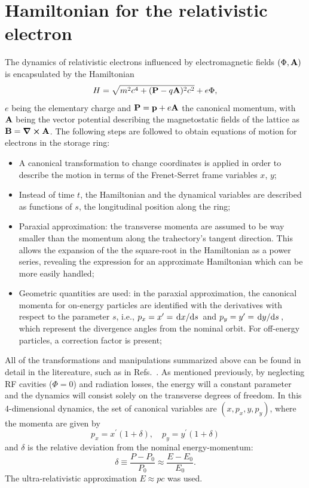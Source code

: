 \section{Hamiltonian for the relativistic electron}
The dynamics of relativistic electrons influenced by electromagnetic fields $(\Phi, \vb{A})$ is encapsulated by the Hamiltonian \cite{landau_classical_1975}
    \begin{equation*}
        H=\sqrt{m^2c^4+(\vb{P}-q\vb{A})^2c^2}+e\Phi,
    \end{equation*}
 $e$ being the elementary charge and $\vb{P}=\vb{p}+e\vb{A}$ the canonical momentum, with $\vb{A}$ being the vector potential describing the magnetostatic fields of the lattice as $\vb{B}=\curl \vb{A}$. The following steps are followed to obtain equations of motion for electrons in the storage ring:
 \begin{itemize}
    \item A canonical transformation to change coordinates is applied in order to describe the motion in terms of the Frenet-Serret frame variables $x$, $y$;
    \item Instead of time $t$, the Hamiltonian and the dynamical variables are described as functions of $s$, the longitudinal position along the ring;
    \item Paraxial approximation: the transverse momenta are assumed to be way smaller than the momentum along the trahectory's tangent direction. This allows the expansion of the the square-root in the Hamiltonian as a power series, revealing the expression for an approximate Hamiltonian which can be more easily handled;
    \item Geometric quantities are used: in the paraxial approximation, the canonical momenta for on-energy particles are identified with the derivatives with respect to the parameter $s$, i.e., $p_x = x^\prime = \dv*{x}{s}$ and $p_y = y^\prime = \dv*{y}{s}$, which represent the divergence angles from the nominal orbit. For off-energy particles, a correction factor is present;
 \end{itemize}
 All of the transformations and manipulations summarized above can be found in detail in the litereature, such as in Refs.~\cite{lee_accelerator_2004, wiedemann_particle_2015,  wolski_beam_2014}. As mentioned previously, by neglecting RF cavities ($\Phi=0$) and radiation losses, the energy will a constant parameter and the dynamics will consist solely on the transverse degrees of freedom.  In this 4-dimensional dynamics, the set of canonical variables are $(x,p_{x},y , p_{y})$, where the momenta are given by
\begin{equation} p_{x}= x^\prime(1+\delta),\quad p_{y}=y^\prime (1+\delta)\end{equation}
and $\delta$ is the relative deviation from the nominal energy-momentum:
\begin{equation}
    \delta \equiv \frac{P-P_{0}}{P_{0}}\approx\frac{E-E_0}{E_0}.
\end{equation}
The ultra-relativistic approximation $E\approx pc$ was used.


